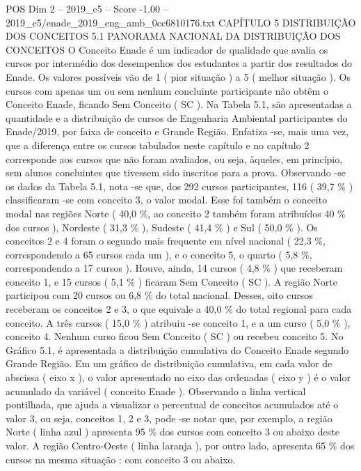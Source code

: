 \begin{textsample}{POS Dim 2 – 2019\_c5 – Score -1.00 – 2019\_c5/enade\_2019\_eng\_amb\_0cc6810176.txt}  \label{ex:f2_pos_337}
CAPÍTULO 5 DISTRIBUIÇÃO DOS CONCEITOS 5.1 PANORAMA NACIONAL DA DISTRIBUIÇÃO DOS CONCEITOS O Conceito Enade é um indicador de qualidade que avalia os cursos por intermédio dos desempenhos dos estudantes a partir dos resultados do Enade.
Os valores possíveis vão de 1 ( pior situação ) a 5 ( melhor situação ).
Os cursos com apenas um ou sem nenhum concluinte participante não obtêm o Conceito Enade, ficando Sem Conceito ( SC ).
Na Tabela 5.1, são apresentadas a quantidade e a distribuição de cursos de Engenharia Ambiental participantes do Enade/2019, por faixa de conceito e Grande Região.
Enfatiza -se, mais uma vez, que a diferença entre os cursos tabulados neste capítulo e no capítulo 2 corresponde aos cursos que não foram avaliados, ou seja, àqueles, em princípio, sem alunos concluintes que tivessem sido inscritos para a prova.
Observando -se os dados da Tabela 5.1, nota -se que, dos 292 cursos participantes, 116 ( 39,7 \% ) classificaram -se com conceito 3, o valor modal.
Esse foi também o conceito modal nas regiões Norte ( 40,0 \%, ao conceito 2 também foram atribuídos 40 \% dos cursos ), Nordeste ( 31,3 \% ), Sudeste ( 41,4 \% ) e Sul ( 50,0 \% ).
Os conceitos 2 e 4 foram o segundo mais frequente em nível nacional ( 22,3 \%, correspondendo a 65 cursos cada um ), e o conceito 5, o quarto ( 5,8 \%, correspondendo a 17 cursos ).
Houve, ainda, 14 cursos ( 4,8 \% ) que receberam conceito 1, e 15 cursos ( 5,1 \% ) ficaram Sem Conceito ( SC ).
A região Norte participou com 20 cursos ou 6,8 \% do total nacional.
Desses, oito cursos receberam os conceitos 2 e 3, o que equivale a 40,0 \% do total regional para cada conceito.
A três cursos ( 15,0 \% ) atribuiu -se conceito 1, e a um curso ( 5,0 \% ), conceito 4.
Nenhum curso ficou Sem Conceito ( SC ) ou recebeu conceito 5.
No Gráfico 5.1, é apresentada a distribuição cumulativa do Conceito Enade segundo Grande Região.
Em um gráfico de distribuição cumulativa, em cada valor de abscissa ( eixo x ), o valor apresentado no eixo das ordenadas ( eixo y ) é o valor acumulado da variável ( conceito Enade ).
Observando a linha vertical pontilhada, que ajuda a visualizar o percentual de conceitos acumulados até o valor 3, ou seja, conceitos 1, 2 e 3, pode -se notar que, por exemplo, a região Norte ( linha azul ) apresenta 95 \% dos cursos com conceito 3 ou abaixo deste valor.
A região Centro-Oeste ( linha laranja ), por outro lado, apresenta 65 \% dos cursos na mesma situação : com conceito 3 ou abaixo.

\end{textsample}
